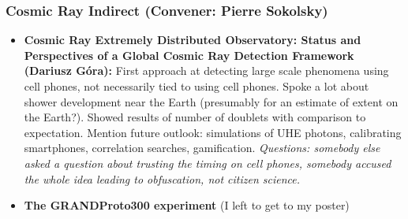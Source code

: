 \subsubsection{Cosmic Ray Indirect (Convener: Pierre Sokolsky)}
\begin{itemize}
    \item \textbf{Cosmic Ray Extremely Distributed Observatory: Status and Perspectives of a Global Cosmic Ray Detection Framework (Dariusz Góra):} First approach at detecting large scale phenomena using cell phones, not necessarily tied to using cell phones. Spoke a lot about shower development near the Earth (presumably for an estimate of extent on the Earth?). Showed results of number of doublets with comparison to expectation. Mention future outlook: simulations of UHE photons, calibrating smartphones, correlation searches, gamification. \textit{Questions: somebody else asked a question about trusting the timing on cell phones, somebody accused the whole idea leading to obfuscation, not citizen science.}
    \item \textbf{The GRANDProto300 experiment} (I left to get to my poster)
\end{itemize}

